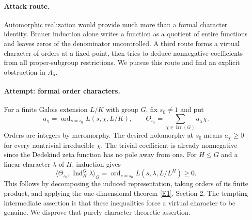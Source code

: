\documentclass[11pt,a4paper]{article}
\newcommand{\eref}[2]{\hyperlink{extra:#1:#2}{[E#2]}}
\numberwithin{equation}{section}
\begin{document}
\paragraph{Attack route.}
Automorphic realization would provide much more than a formal character identity. Brauer induction alone writes a function as a quotient of entire functions and leaves zeros of the denominator uncontrolled. A third route forms a virtual character of orders at a fixed point, then tries to deduce nonnegative coefficients from all proper-subgroup restrictions. We pursue this route and find an explicit obstruction in $A_5$.

\paragraph{Attempt: formal order characters.}
For a finite Galois extension $L/K$ with group $G$, fix $s_0\ne1$ and put
\[
 a_\chi=\operatorname{ord}_{s=s_0}L(s,\chi,L/K),\qquad
 \Theta_{s_0}=\sum_{\chi\in\operatorname{Irr}(G)}a_\chi\chi.
\]
Orders are integers by meromorphy. The desired holomorphy at $s_0$ means $a_\chi\ge0$ for every nontrivial irreducible $\chi$. The trivial coefficient is already nonnegative since the Dedekind zeta function has no pole away from one. For $H\le G$ and a linear character $\lambda$ of $H$, induction gives
\begin{equation}\label{r66:tests}
 \langle\Theta_{s_0},\operatorname{Ind}_H^G\lambda\rangle_G
 =\operatorname{ord}_{s=s_0}L(s,\lambda,L/L^H)\ge0.
\end{equation}
This follows by decomposing the induced representation, taking orders of its finite product, and applying the one-dimensional theorem \eref{statement}{1}, Section 2. The tempting intermediate assertion is that these inequalities force a virtual character to be genuine. We disprove that purely character-theoretic assertion.
\end{document}
